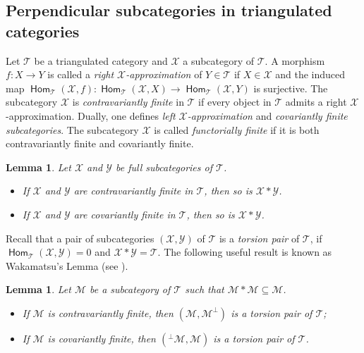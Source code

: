 \documentclass[12pt,a4paper,reqno]{amsart}
\newtheorem{lemma}[theorem]{Lemma}
\theoremstyle{definition}
\newcommand{\opname}[1]{\operatorname{\mathsf{#1}}}
\newcommand{\Hom}{\opname{Hom}}
\begin{document}
\subsection{Perpendicular subcategories in triangulated categories} 
Let $\mathcal{T}$ be a triangulated category and  $\mathcal{X}$  a subcategory of $\mathcal{T}$. A morphism $f: X \to Y$ is called a {\em right $\mathcal{X}$-approximation} of $Y \in \mathcal{T}$ if $X \in \mathcal{X}$ and the induced map $\Hom_\mathcal{T}(\mathcal{X}, f): \Hom_\mathcal{T}(\mathcal{X}, X) \to \Hom_\mathcal{T}(\mathcal{X}, Y)$ is surjective. The subcategory $\mathcal{X}$ is {\em contravariantly finite} in $\mathcal{T}$ if every object in $\mathcal{T}$ admits a right $\mathcal{X}$-approximation. Dually, one defines {\em left $\mathcal{X}$-approximation} and {\em covariantly finite subcategories}. The subcategory $\mathcal{X}$ is called {\em functorially finite} if it is both contravariantly finite and covariantly finite. 

\begin{lemma}\textnormal{\cite[Proposition 5.33]{IO}}\label{l:X*Y-functorially-finite}
Let  $\mathcal{X}$ and $\mathcal{Y}$ be full subcategories of $\mathcal{T}$. 
\begin{itemize}
    \item[(1)] If $\mathcal{X}$ and $\mathcal{Y}$ are contravariantly finite in $\mathcal{T}$, then so is $\mathcal{X} \ast \mathcal{Y}$.
    \item[(2)] If $\mathcal{X}$ and $\mathcal{Y}$ are covariantly finite in $\mathcal{T}$, then so is $\mathcal{X} * \mathcal{Y}$.
\end{itemize}
\end{lemma}



Recall that a pair of subcategories $(\mathcal{X}, \mathcal{Y})$ of $\mathcal{T}$ is a {\em torsion pair} of $\mathcal{T}$, if  $\Hom_{\mathcal{T}}(\mathcal{X}, \mathcal{Y})=0$ and $\mathcal{X}*\mathcal{Y}=\mathcal{T}$. The following useful result is known as Wakamatsu's Lemma (see \cite[Lemma 2.22]{AiharaIyama}).
\begin{lemma}\label{l:wakamatsu-lemma}
Let $\mathcal{M}$ be a subcategory of $\mathcal{T}$ such that $\mathcal{M}*\mathcal{M}\subseteq \mathcal{M}$.
\begin{itemize}
\item[(1)]  If $\mathcal{M}$ is contravariantly finite, then $(\mathcal{M}, \mathcal{M}^\perp)$ is a torsion pair of $\mathcal{T}$;
\item[(2)] If $\mathcal{M}$ is covariantly finite, then $(\!^\perp\mathcal{M}, \mathcal{M})$ is a torsion pair of $\mathcal{T}$.
\end{itemize}
\end{lemma}
\end{document}
